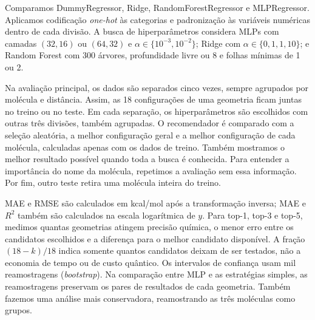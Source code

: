 Comparamos DummyRegressor, Ridge, RandomForestRegressor e MLPRegressor. Aplicamos
codificação \textit{one-hot}
às categorias e padronização às variáveis numéricas dentro de cada divisão. A
busca de hiperparâmetros considera MLPs com camadas $(32,16)$ ou $(64,32)$ e
$\alpha\in\{10^{-3},10^{-2}\}$; Ridge com
$\alpha\in\{0{,}1,1,10\}$; e Random Forest com 300 árvores, profundidade livre
ou 8 e folhas mínimas de 1 ou 2.

Na avaliação principal, os dados são separados cinco vezes, sempre agrupados
por molécula e distância. Assim, as 18 configurações de uma geometria ficam
juntas no treino ou no teste. Em cada separação, os hiperparâmetros são escolhidos
com outras três divisões, também agrupadas. O recomendador é comparado com a
seleção aleatória, a melhor configuração geral e a melhor configuração de cada
molécula, calculadas apenas com os dados de treino. Também mostramos o melhor
resultado possível quando toda a busca é conhecida. Para entender a importância
do nome da molécula, repetimos a avaliação sem essa informação. Por fim, outro
teste retira uma molécula inteira do treino.

MAE e RMSE são calculados em kcal/mol após a transformação inversa; MAE e
$R^2$ também são calculados na escala logarítmica de $y$. Para top-1, top-3 e
top-5, medimos quantas
geometrias atingem precisão química, o menor erro entre os candidatos escolhidos
e a diferença para o melhor candidato disponível. A fração $(18-k)/18$ indica
somente quantos candidatos deixam de ser testados, não a economia de tempo ou de
custo quântico. Os intervalos de confiança usam mil reamostragens
(\textit{bootstrap}). Na comparação entre MLP e as estratégias simples, as
reamostragens preservam os pares de resultados de cada geometria. Também fazemos
uma análise mais conservadora, reamostrando as três moléculas como grupos.